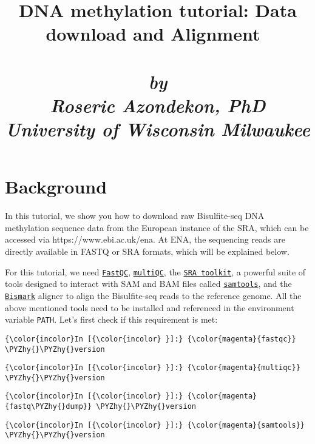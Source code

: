 \documentclass[11pt]{article}
\title{DNA methylation tutorial: Data download and Alignment~\\~\\\small{\emph{by \\Roseric Azondekon, PhD\\University of Wisconsin Milwaukee}}}
\def\PYZhy{\char`\-}
\begin{document}
    
    
    \maketitle
    
    


    \hypertarget{background}{%
\section*{Background}\label{background}}
    In this tutorial, we show you how to download raw Bisulfite-seq DNA
methylation sequence data from the European instance of the SRA, which
can be accessed via https://www.ebi.ac.uk/ena. At ENA, the sequencing
reads are directly available in FASTQ or SRA formats, which will be
explained below.

For this tutorial, we need \href{https://www.bioinformatics.babraham.ac.uk/projects/fastqc/}{\texttt{FastQC}}, \href{https://multiqc.info/}{\texttt{multiQC}}, the \href{https://www.ncbi.nlm.nih.gov/sra/docs/toolkitsoft/}{\texttt{SRA toolkit}}, a powerful suite of tools designed to interact with SAM and BAM files called \href{https://sourceforge.net/projects/samtools/files/}{\texttt{samtools}}, and the \href{https://github.com/FelixKrueger/Bismark}{\texttt{Bismark}} aligner to align the Bisulfite-seq reads to the
reference genome. All the above mentioned tools need to be installed and
referenced in the environment variable \texttt{PATH}. Let's first check
if this requirement is met:

    \begin{Verbatim}[commandchars=\\\{\}]
{\color{incolor}In [{\color{incolor} }]:} {\color{magenta}{fastqc}} \PYZhy{}\PYZhy{}version
\end{Verbatim}

    \begin{Verbatim}[commandchars=\\\{\}]
{\color{incolor}In [{\color{incolor} }]:} {\color{magenta}{multiqc}} \PYZhy{}\PYZhy{}version
\end{Verbatim}

    \begin{Verbatim}[commandchars=\\\{\}]
{\color{incolor}In [{\color{incolor} }]:} {\color{magenta}{fastq\PYZhy{}dump}} \PYZhy{}\PYZhy{}version
\end{Verbatim}

    \begin{Verbatim}[commandchars=\\\{\}]
{\color{incolor}In [{\color{incolor} }]:} {\color{magenta}{samtools}} \PYZhy{}\PYZhy{}version
\end{Verbatim}
\end{document}
